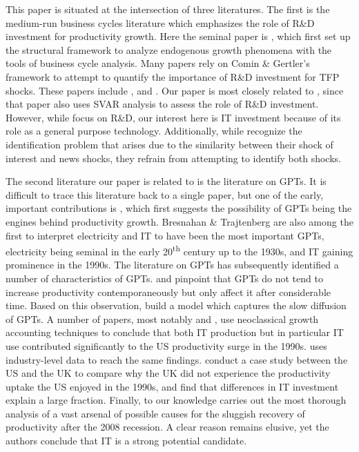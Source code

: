 \documentclass[11pt]{article}
\renewcommand{\[}{\begin{equation}}
\renewcommand{\]}{\end{equation}}
\begin{document}
This paper is situated at the intersection of three literatures. The first is the medium-run business cycles literature which emphasizes the role of R\&D investment for productivity growth. Here the seminal paper is \cite{comin_gertler2006}, which first set up the structural framework to analyze endogenous growth phenomena with the tools of business cycle analysis. Many papers rely on Comin \& Gertler's framework to attempt to quantify the importance of R\&D investment for TFP shocks. These papers include \cite{anzo_etal2016}, \cite{comin_etal2016} and \cite{moran_queralto2017}. Our paper is most closely related to \cite{moran_queralto2017}, since that paper also uses SVAR analysis to assess the role of R\&D investment. However, while \cite{moran_queralto2017} focus on R\&D, our interest here is IT investment because of its role as a general purpose technology. Additionally, while \cite{moran_queralto2017} recognize the identification problem that arises due to the similarity between their shock of interest and news shocks, they refrain from attempting to identify both shocks. 

The second literature our paper is related to is the literature on GPTs. It is difficult to trace this literature back to a single paper, but one of the early, important contributions is \cite{bresnahan_trajtenberg1992}, which first suggests the possibility of GPTs being the engines behind productivity growth. Bresnahan \& Trajtenberg are also among the first to interpret electricity and IT to have been the most important GPTs, electricity being seminal in the early 20\textsuperscript{th} century up to the 1930s, and IT gaining prominence in the 1990s. The literature on GPTs has subsequently identified a number of characteristics of GPTs. \cite{david1990} and \cite{jov_rous2005} pinpoint that GPTs do not tend to increase productivity contemporaneously but only affect it after considerable time. Based on this observation, \cite{atkeson_kehoe2007} build a model which captures the slow diffusion of GPTs. A number of papers, most notably \cite{oliner_sichel2000} and \cite{oulton2010}, use neoclassical growth accounting techniques to conclude that both IT production but in particular IT use contributed significantly to the US productivity surge in the 1990s. \cite{stiroh2002} uses industry-level data to reach the same findings. \cite{basu_etal2004} conduct a case study between the US and the UK to compare why the UK did not experience the productivity uptake the US enjoyed in the 1990s, and find that differences in IT investment explain a large fraction. Finally, to our knowledge \cite{allstar_paper} carries out the most thorough analysis of a vast arsenal of possible causes for the sluggish recovery of productivity after the 2008 recession. A clear reason remains elusive, yet the authors conclude that IT is a strong potential candidate. 
\end{document}
